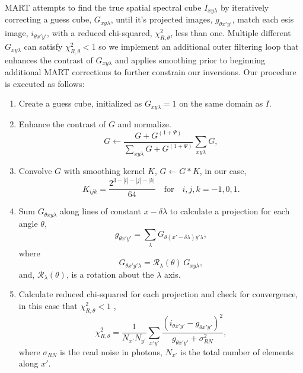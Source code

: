 	MART attempts to find the true spatial spectral cube $I_{xy\lambda}$ by iteratively correcting a guess cube, $G_{xy\lambda}$, until it's projected images, $g_{\theta x'y'}$, match each esis image, $i_{\theta x'y'}$, with a reduced chi-squared, $\chi_{R,\theta}^2$,  less than one.
	Multiple different $G_{xy\lambda}$ can satisfy $\chi_{R,\theta}^2<1$ so we implement an additional outer filtering loop that enhances the contrast of $G_{xy\lambda}$ and applies smoothing prior to beginning additional MART corrections to further constrain our inversions.
	Our procedure is executed as follows:
	\begin{enumerate}
		\item \label{step:guess} Create a guess cube,
		initialized as 
		$G_{xy\lambda} = 1$ on the same domain as $I$. 
		\item \label{step:contrast} Enhance the contrast of $G$ and normalize. 
			\begin{equation}
				G \leftarrow \frac{G+G^{(1+\Psi)}}{\sum_{xy\lambda}G+G^{(1+\Psi)}}\sum_{xy\lambda}G, 
			\end{equation}
		
		\item \label{step:smooth} Convolve $G$ with smoothing kernel $K$, $G \leftarrow G * K$,
		in our case,
			\begin{equation}
			\label{eq:kernel}
				K_{ijk} = \frac{2^{3-|i|-|j|-|k|}}{64} \quad \text{for}\quad i,j,k = -1,0,1.
			\end{equation}
		\item \label{step:project} Sum $G_{\theta xy\lambda}$ along lines of constant $x-\delta\lambda$ to calculate a projection for each angle $\theta$,
			\begin{equation}
				g_{\theta x'y'} = \sum_\lambda G_{\theta(x'-\delta\lambda)y'\lambda}, 
			\end{equation}
		where
			\begin{equation}
				G_{\theta x'y'\lambda} = \mathcal{R}_\lambda(\theta)\,G_{xy\lambda},
			\end{equation} 
		and, $\mathcal{R}_\lambda (\theta)$, is a rotation about the $\lambda$ axis. 	
		
		\item \label{step:chisquared} Calculate reduced chi-squared for each projection and check for convergence, in this case that $\chi_{R,\theta}^2 < 1$ , 
			\begin{equation}
				\chi_{R,\theta}^2 = \frac{1}{N_{x'} N_{y'}}\sum_{x'y'} \frac{(i_{\theta x'y'}-g_{\theta x'y'})^2}{g_{\theta x'y'}+\sigma^2_{RN}},
			\end{equation}
		where $\sigma_{RN}$ is the read noise in photons, $N_{x'}$ is the total number of elements along $x'$.
		

\end{enumerate}
